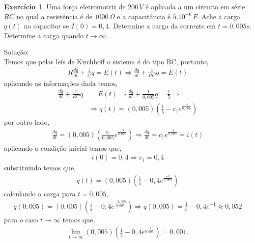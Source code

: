 \documentclass[a4paper,12pt,reqno,natbib]{amsart}
\theoremstyle{definition}
\newtheorem{exercise}{Exerc\'icio}
\begin{document}
\begin{exercise}
Uma força eletromotriz de $200\,V$ é aplicada a um circuito em série $RC$ no qual a resistência é de $1000\,\Omega$ e a capacitância é $5.10^{-6}\,F$. Ache a carga $q(t)$ no
capacitor se $I(0) = 0,4$. Determine a carga da corrente em $t = 0,005s$. Determine a carga quando $t \rightarrow \infty$.
\end{exercise}
Solu\c c\~ao:\\
Temos que pelas le\'is de Kirchhoff o sistema \'e do tipo RC, portanto,
\begin{align*}
	R\frac{dq}{dt} + \frac{1}{C}q = E(t) \Rightarrow \frac{dq}{dt} + \frac{1}{RC}q = E(t)
\end{align*}
aplicando as informa\c c\~oes dada temos,
\begin{align*}
	\frac{dq}{dt} + \frac{1}{RC}q &= E(t) \Rightarrow \frac{dq}{dt} + \frac{1}{0,005}q = \frac{1}{5} \Rightarrow \\
	&\Rightarrow  q(t) = (0,005)\left ( \frac{1}{5} -c_1e^{\frac{-t}{0,005}}\right )
\end{align*}
por outro lado,
\begin{align*}
	\frac{dq}{dt} =  (0,005)\left (\frac{c_1}{0,005}e^{\frac{-t}{0,005}}\right ) \Rightarrow \frac{dq}{dt} = c_1
	e^{\frac{-t}{0,005}} = i(t)
\end{align*}
aplicando a condi\c c\~ao inicial temos que,
\begin{align*}
	i(0) = 0,4 \Rightarrow  c_1 = 0,4
 \end{align*}
substituindo temos que,
\begin{align*}
  q(t) = (0,005)\left ( \frac{1}{5} -0,4e^{\frac{-t}{0,005}}\right )
\end{align*}
calculando a carga para $t = 0,005$,
\begin{align*}
  q(0,005) = (0,005)\left ( \frac{1}{5} -0,4e^{\frac{-0,005}{0,005}}\right ) \Rightarrow q(0,005) =  \frac{1}{5}
  -0,4e^{{-1}} \approx 0,052
\end{align*}
para o caso $t \rightarrow \infty$ temos que,
\begin{align*}
	\lim_{t\rightarrow\infty} (0,005)\left ( \frac{1}{5} -0,4e^{\frac{-t}{0,005}}\right ) = 0,001.
\end{align*}

\vspace{0.6 cm}
\end{document}
